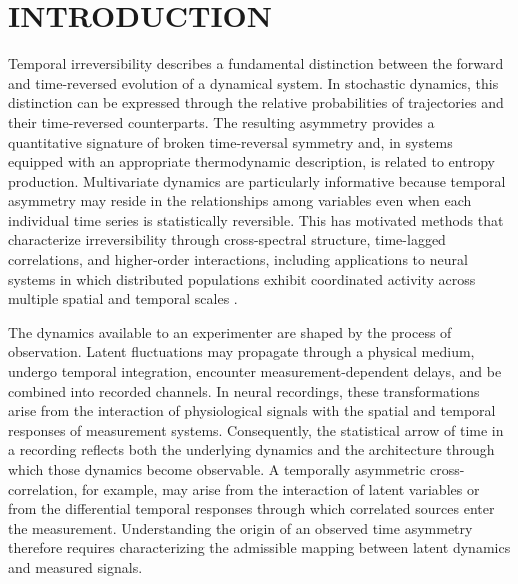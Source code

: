 \documentclass[aps,pre,reprint,amsmath,amssymb,superscriptaddress]{revtex4-2}
\begin{document}
\section{INTRODUCTION}

Temporal irreversibility describes a fundamental distinction between the forward and time-reversed evolution of a dynamical system. In stochastic dynamics, this distinction can be expressed through the relative probabilities of trajectories and their time-reversed counterparts. The resulting asymmetry provides a quantitative signature of broken time-reversal symmetry and, in systems equipped with an appropriate thermodynamic description, is related to entropy production. Multivariate dynamics are particularly informative because temporal asymmetry may reside in the relationships among variables even when each individual time series is statistically reversible. This has motivated methods that characterize irreversibility through cross-spectral structure, time-lagged correlations, and higher-order interactions, including applications to neural systems in which distributed populations exhibit coordinated activity across multiple spatial and temporal scales \cite{seara2021,nartallo2025,yao2024}.

The dynamics available to an experimenter are shaped by the process of observation. Latent fluctuations may propagate through a physical medium, undergo temporal integration, encounter measurement-dependent delays, and be combined into recorded channels. In neural recordings, these transformations arise from the interaction of physiological signals with the spatial and temporal responses of measurement systems. Consequently, the statistical arrow of time in a recording reflects both the underlying dynamics and the architecture through which those dynamics become observable. A temporally asymmetric cross-correlation, for example, may arise from the interaction of latent variables or from the differential temporal responses through which correlated sources enter the measurement. Understanding the origin of an observed time asymmetry therefore requires characterizing the admissible mapping between latent dynamics and measured signals.
\end{document}
